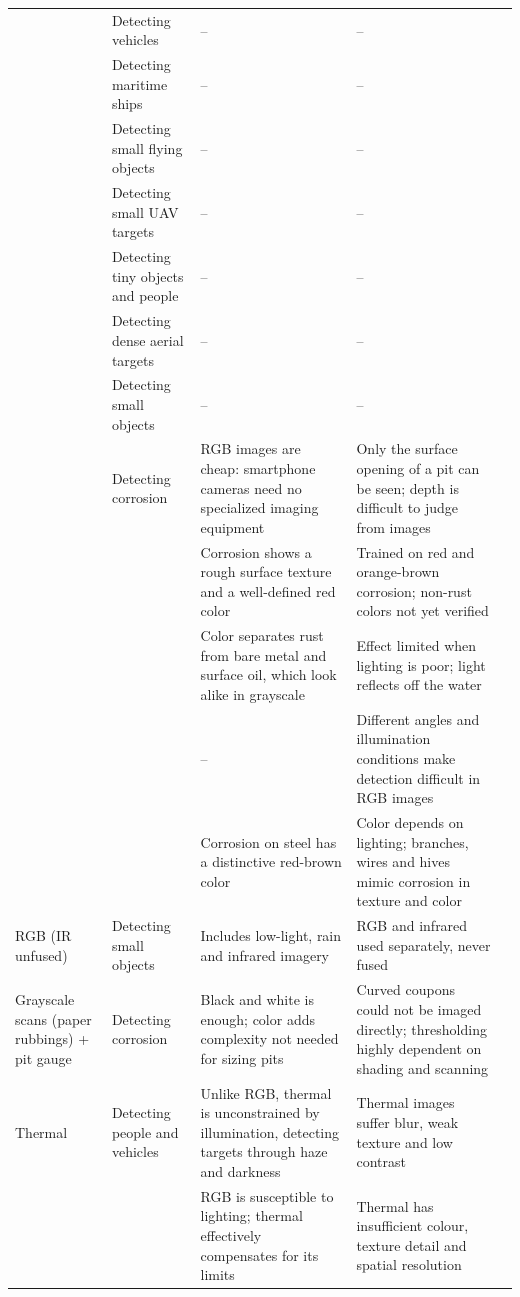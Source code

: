 {\begin{xltabular}{\textwidth}{>{\RaggedRight\arraybackslash}p{2.1cm}>{\RaggedRight\arraybackslash}p{2.9cm}>{\RaggedRight\arraybackslash}X>{\RaggedRight\arraybackslash}Xp{0.95cm}}
 & Detecting vehicles & -- & -- & \citep{Liu2026a} \\
 & Detecting maritime ships & -- & -- & \citep{Mbietieu2025} \\
 & Detecting small flying objects & -- & -- & \citep{Tao2021} \\
 & Detecting small UAV targets & -- & -- & \citep{Jiang2025} \\
 & Detecting tiny objects and people & -- & -- & \citep{Chen2025} \\
 & Detecting dense aerial targets & -- & -- & \citep{Sun2023} \\
 & Detecting small objects & -- & -- & \citep{Zheng2023} \\
 & Detecting corrosion & RGB images are cheap: smartphone cameras need no specialized imaging equipment & Only the surface opening of a pit can be seen; depth is difficult to judge from images & \citep{Suzuki2026} \\
 &  & Corrosion shows a rough surface texture and a well-defined red color & Trained on red and orange-brown corrosion; non-rust colors not yet verified & \citep{Rahman2021} \\
 &  & Color separates rust from bare metal and surface oil, which look alike in grayscale & Effect limited when lighting is poor; light reflects off the water & \citep{Hu2023} \\
 &  & -- & Different angles and illumination conditions make detection difficult in RGB images & \citep{Yu2023} \\
 &  & Corrosion on steel has a distinctive red-brown color & Color depends on lighting; branches, wires and hives mimic corrosion in texture and color & \citep{HerndonTien2025} \\
\midrule
RGB (IR unfused) & Detecting small objects & Includes low-light, rain and infrared imagery & RGB and infrared used separately, never fused & \citep{Zhang2026c} \\
\midrule
Grayscale scans (paper rubbings) + pit gauge & Detecting corrosion & Black and white is enough; color adds complexity not needed for sizing pits & Curved coupons could not be imaged directly; thresholding highly dependent on shading and scanning & \citep{Khodabux2021a} \\
\midrule
Thermal & Detecting people and vehicles & Unlike RGB, thermal is unconstrained by illumination, detecting targets through haze and darkness & Thermal images suffer blur, weak texture and low contrast & \citep{Liu2026c} \\
 &  & RGB is susceptible to lighting; thermal effectively compensates for its limits & Thermal has insufficient colour, texture detail and spatial resolution & \citep{Wang2024b} \\

\end{xltabular}}
